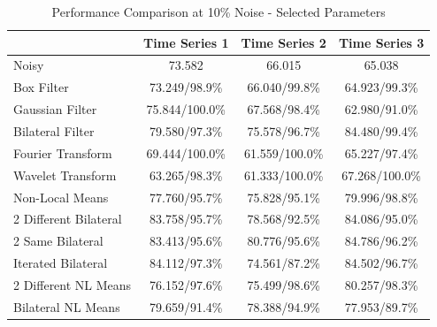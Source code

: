 \documentclass[11pt]{article}
\theoremstyle{definition}
\begin{document}
\begin{table}
\small
\begin{center}
\begin{tabular}{lccc}
\hline 
 & Time Series 1 & Time Series 2 & Time Series 3 \\ \hline
Noisy & 73.582 & 66.015 & 65.038 \\ \hline
Box Filter &73.249/98.9\% &66.040/99.8\% & 64.923/99.3\% \\ \hline
Gaussian Filter & 75.844/100.0\% & 67.568/98.4\% & 62.980/91.0\% \\ \hline
Bilateral Filter & 79.580/97.3\% & 75.578/96.7\% & 84.480/99.4\% \\ \hline
Fourier Transform & 69.444/100.0\% & 61.559/100.0\% & 65.227/97.4\% \\ \hline
Wavelet Transform & 63.265/98.3\% & 61.333/100.0\% & 67.268/100.0\% \\ \hline
Non-Local Means & 77.760/95.7\% & 75.828/95.1\% & 79.996/98.8\% \\ \hline
2 Different Bilateral & 83.758/95.7\% & 78.568/92.5\% & 84.086/95.0\% \\ \hline
2 Same Bilateral & 83.413/95.6\% & 80.776/95.6\% & 84.786/96.2\% \\ \hline
Iterated Bilateral & 84.112/97.3\% & 74.561/87.2\% & 84.502/96.7\% \\ \hline
2 Different NL Means & 76.152/97.6\% & 75.499/98.6\% & 80.257/98.3\% \\ \hline
Bilateral NL Means & 79.659/91.4\% & 78.388/94.9\% & 77.953/89.7\% \\ \hline 
\end{tabular}
\caption{Performance Comparison at 10\% Noise - Selected Parameters}
\label{comparisonselected}
\end{center}
\end{table}
\end{document}
